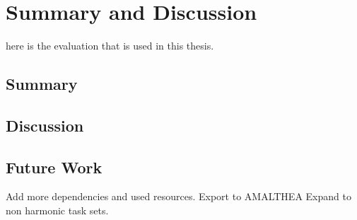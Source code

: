 \chapter{Summary and Discussion}\label{ch:summary_discussion}
here is the evaluation that is used in this thesis.

\section{Summary}

\section{Discussion}

\section{Future Work}
Add more dependencies and used resources.
Export to AMALTHEA
Expand to non harmonic task sets.